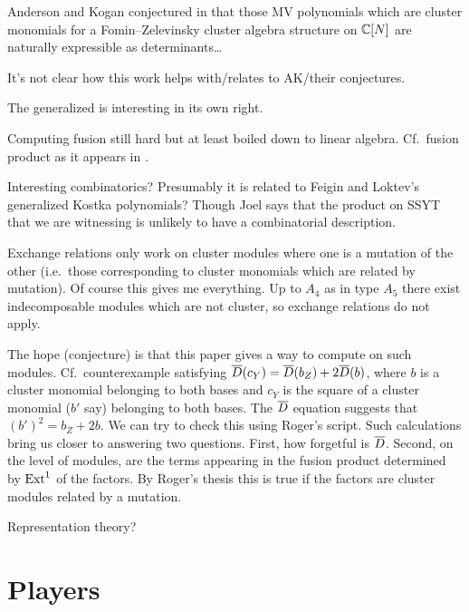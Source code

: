 \documentclass{article} %
\begin{document}
Anderson and Kogan conjectured in \cite{anderson2006algebra}  that those MV polynomials which are cluster monomials for a Fomin--Zelevinsky cluster algebra structure on $\mathbb C[N]$ are naturally expressible as determinants\dots

It's not clear how this work helps with/relates to AK/their conjectures.

The generalized \mvy is interesting in its own right. 

Computing fusion still hard but at least boiled down to linear algebra. Cf.\ fusion product as it appears in \cite{beilinson1991quantization,feigin2generalized,mirkovic2007geometric,anderson2006algebra,bezrukavnikov2005equivariant}.

Interesting combinatorics? Presumably it is related to Feigin and Loktev's generalized Kostka polynomials? Though Joel says that the product on SSYT that we are witnessing is unlikely to have a combinatorial description. 

Exchange relations only work on cluster modules where one is a mutation of the other (i.e.\ those corresponding to cluster monomials which are related by mutation). Of course this gives me everything. Up to $A_4$ as in type $A_5$ there exist indecomposable modules which are not cluster, so exchange relations do not apply. 

The hope (conjecture) is that this paper gives a way to compute on such modules. Cf.\ counterexample satisfying $\overline{D}(c_Y) = \overline{D}(b_Z) + 2\overline{D}(b)$, where $b$ is a cluster monomial belonging to both bases and $c_Y$ is the square of a cluster monomial ($b'$ say) belonging to both bases. The $\overline{D}$ equation suggests that $(b')^2 = b_Z + 2b$. We can try to check this using Roger's script. Such calculations bring us closer to answering two questions. First, how forgetful is $\overline{D}$. Second, on the level of modules, are the terms appearing in the fusion product determined by $\operatorname{Ext}^1$ of the factors. By Roger's thesis this is true if the factors are cluster modules related by a mutation. 


Representation theory? 

\section{Players}
\label{s:players}
\end{document}
